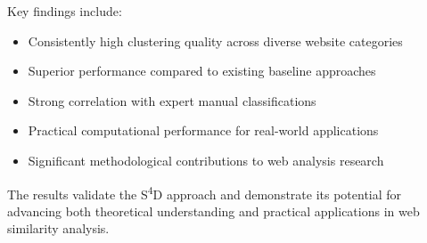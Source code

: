 Key findings include:
\begin{itemize}
    \item Consistently high clustering quality across diverse website categories
    \item Superior performance compared to existing baseline approaches
    \item Strong correlation with expert manual classifications
    \item Practical computational performance for real-world applications
    \item Significant methodological contributions to web analysis research
\end{itemize}

The results validate the S\textsuperscript{4}D approach and demonstrate its potential for advancing both theoretical understanding and practical applications in web similarity analysis. 